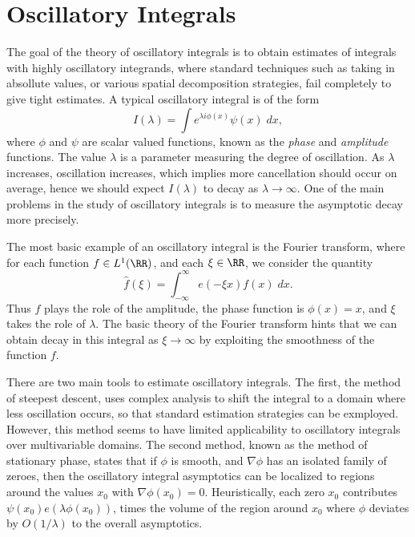 \chapter{Oscillatory Integrals}

The goal of the theory of oscillatory integrals is to obtain estimates of integrals with highly oscillatory integrands, where standard techniques such as taking in absollute values, or various spatial decomposition strategies, fail completely to give tight estimates. A typical oscillatory integral is of the form
%
\[ I(\lambda) = \int e^{\lambda i \phi(x)} \psi(x)\; dx, \]
%
where $\phi$ and $\psi$ are scalar valued functions, known as the \emph{phase} and \emph{amplitude} functions. The value $\lambda$ is a parameter measuring the degree of oscillation. As $\lambda$ increases, oscillation increases, which implies more cancellation should occur on average, hence we should expect $I(\lambda)$ to decay as $\lambda \to \infty$. One of the main problems in the study of oscillatory integrals is to measure the asymptotic decay more precisely.

\begin{example}
    The most basic example of an oscillatory integral is the Fourier transform, where for each function $f \in L^1(\RR)$, and each $\xi \in \RR$, we consider the quantity
    \[ \widehat{f}(\xi) = \int_{-\infty}^\infty e(-\xi x) f(x)\; dx. \]
    Thus $f$ plays the role of the amplitude, the phase function is $\phi(x) = x$, and $\xi$ takes the role of $\lambda$. The basic theory of the Fourier transform hints that we can obtain decay in this integral as $\xi \to \infty$ by exploiting the smoothness of the function $f$.
\end{example}

There are two main tools to estimate oscillatory integrals. The first, the method of steepest descent, uses complex analysis to shift the integral to a domain where less oscillation occurs, so that standard estimation strategies can be exmployed. However, this method seems to have limited applicability to oscillatory integrals over multivariable domains. The second method, known as the method of stationary phase, states that if $\phi$ is smooth, and $\nabla \phi$ has an isolated family of zeroes, then the oscillatory integral asymptotics can be localized to regions around the values $x_0$ with $\nabla \phi(x_0) = 0$. Heuristically, each zero $x_0$ contributes $\psi(x_0) e ( \lambda \phi(x_0) )$, times the volume of the region around $x_0$ where $\phi$ deviates by $O(1/\lambda)$ to the overall asymptotics.

